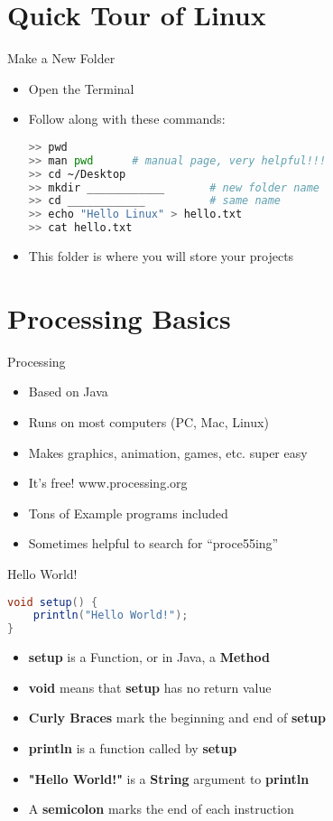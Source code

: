 \documentclass[pdf]{beamer}
\begin{document}
\section{Quick Tour of Linux}
\begin{frame}[fragile]{Make a New Folder}
\begin{itemize}
\item Open the Terminal
\item Follow along with these commands:
\begin{lstlisting}[language=Bash]
>> pwd
>> man pwd      # manual page, very helpful!!!
>> cd ~/Desktop
>> mkdir ____________       # new folder name
>> cd ____________          # same name
>> echo "Hello Linux" > hello.txt
>> cat hello.txt
\end{lstlisting}
\item This folder is where you will store your projects
\end{itemize}
\end{frame}



\section{Processing Basics}
\begin{frame}{Processing}
\begin{itemize}
\item Based on Java
\item Runs on most computers (PC, Mac, Linux)
\item Makes graphics, animation, games, etc. super easy
\item It's free! www.processing.org
\item Tons of Example programs included
\item Sometimes helpful to search for ``proce55ing''
\end{itemize}
\end{frame}


\begin{frame}[fragile]{Hello World!}
\begin{lstlisting}[language=Java]
void setup() {
    println("Hello World!");
}
\end{lstlisting}
\begin{itemize}
\item \textbf{setup} is a Function, or in Java, a \textbf{Method}
\item \textbf{void} means that \textbf{setup} has no return value
\item \textbf{Curly Braces} mark the beginning and end of \textbf{setup}
\item \textbf{println} is a function called by \textbf{setup}
\item \textbf{"Hello World!"} is a \textbf{String} argument to \textbf{println}
\item A \textbf{semicolon} marks the end of each instruction
\end{itemize}
\end{frame}
\end{document}
